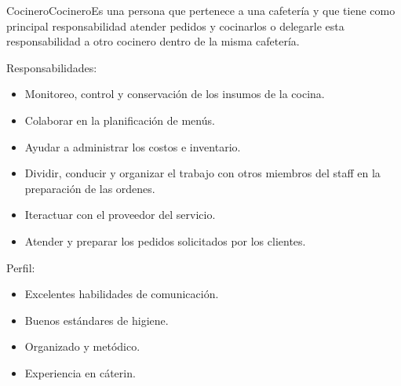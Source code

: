 \begin{Actor}{Cocinero}{Cocinero}{Es una persona que pertenece a una cafetería y que tiene como principal responsabilidad atender pedidos y cocinarlos o delegarle esta responsabilidad a otro cocinero dentro de la misma cafetería.}
	\item[Responsabilidades:]\hspace{1pt}
		\begin{itemize}
			\item Monitoreo, control y conservación de los insumos de la cocina.
			
			\item Colaborar en la planificación de menús.
			
			\item Ayudar a administrar los costos e inventario.
			
			\item Dividir, conducir y organizar el trabajo con otros miembros del staff en la preparación de las ordenes.
			
			\item Iteractuar con el proveedor del servicio.
			
			\item Atender y preparar los pedidos solicitados por los clientes.
		\end{itemize}
	
	\item[Perfil:] \hspace{0.5cm}
		\begin{itemize}
			\item Excelentes habilidades de comunicación.
			
			\item Buenos estándares de higiene.
			
			\item Organizado y metódico.
			
			\item Experiencia en cáterin.
		\end{itemize}
\end{Actor}


